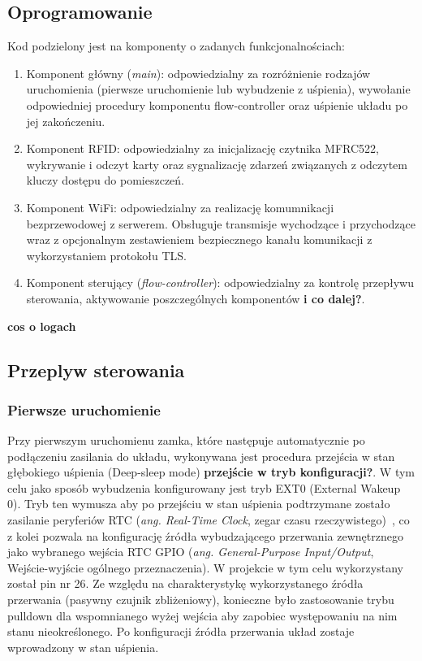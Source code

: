    \subsection{Oprogramowanie}

        Kod podzielony jest na komponenty o zadanych funkcjonalnościach:
        \begin{enumerate}
            \item Komponent główny (\textit{main}): odpowiedzialny za rozróżnienie rodzajów uruchomienia (pierwsze uruchomienie lub wybudzenie z uśpienia), wywołanie odpowiedniej procedury komponentu flow-controller oraz uśpienie układu po jej zakończeniu.
            \item Komponent RFID: odpowiedzialny za inicjalizację czytnika MFRC522, wykrywanie i odczyt karty oraz sygnalizację zdarzeń związanych z odczytem kluczy dostępu do pomieszczeń.
            \item Komponent WiFi: odpowiedzialny za realizację komumnikacji bezprzewodowej z serwerem. Obsługuje transmisje wychodzące i przychodzące wraz z opcjonalnym zestawieniem bezpiecznego kanału komunikacji z wykorzystaniem protokołu TLS.
            \item Komponent sterujący (\textit{flow-controller}): odpowiedzialny za kontrolę przepływu sterowania, aktywowanie poszczególnych komponentów \textbf{i co dalej?}.
        \end{enumerate}
        \textbf{cos o logach}

    \subsection{Przeplyw sterowania}

        \subsubsection{Pierwsze uruchomienie}

            Przy pierwszym uruchomienu zamka, które następuje automatycznie po podłączeniu zasilania do układu, wykonywana jest procedura przejścia w stan głębokiego uśpienia (Deep-sleep mode) \textbf{przejście w tryb konfiguracji?}. W tym celu jako sposób wybudzenia konfigurowany jest tryb EXT0 (External Wakeup 0). Tryb ten wymusza aby po przejściu w stan uśpienia podtrzymane zostało zasilanie peryferiów RTC (\textit{ang. Real-Time Clock}, zegar czasu rzeczywistego)~\cite{esp32-api-ref-deep-sleep}, co z kolei pozwala na konfigurację źródła wybudzającego przerwania zewnętrznego jako wybranego wejścia RTC GPIO (\textit{ang. General-Purpose Input/Output}, Wejście-wyjście ogólnego przeznaczenia). W projekcie w tym celu wykorzystany został pin nr 26. Ze względu na charakterystykę wykorzystanego źródła przerwania (pasywny czujnik zbliżeniowy), konieczne było zastosowanie trybu pulldown dla wspomnianego wyżej wejścia aby zapobiec występowaniu na nim stanu nieokreślonego. Po konfiguracji źródła przerwania układ zostaje wprowadzony w stan uśpienia.

